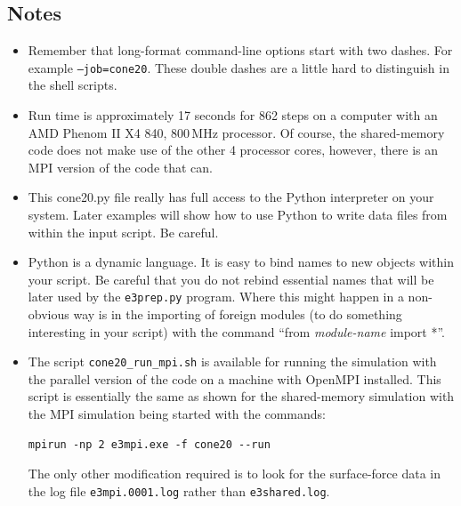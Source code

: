 \subsection{Notes}
\begin{itemize}
\item Remember that long-format command-line options start with two dashes.
      For example \texttt{--job=cone20}.
      These double dashes are a little hard to distinguish in the shell
      scripts.

\item Run time is approximately 17 seconds for 862 steps on a computer with 
      an AMD Phenom II X4 840, 800\,MHz processor.
      Of course, the shared-memory code does not make use of the other 4 processor cores,
      however, there is an MPI version of the code that can.

\item This cone20.py file really has full access to the Python interpreter
      on your system.  Later examples will show how to use Python to write
      data files from within the input script.  Be careful.

\item Python is a dynamic language.
      It is easy to bind names to new objects within your script.
      Be careful that you do not rebind essential names that will be
      later used by the \texttt{e3prep.py} program.
      Where this might happen in a non-obvious way is in the importing
      of foreign modules (to do something interesting in your script)
      with the command ``from \textit{module-name} import *''.

\item The script \texttt{cone20\_run\_mpi.sh} is available for running the simulation
  with the parallel version of the code on a machine with OpenMPI installed.
  This script is essentially the same as shown for the shared-memory simulation
  with the MPI simulation being started with the commands:
\begin{verbatim}
mpirun -np 2 e3mpi.exe -f cone20 --run
\end{verbatim}
  The only other modification required is to look for the surface-force data in the
  log file \texttt{e3mpi.0001.log} rather than \texttt{e3shared.log}.

\end{itemize}
